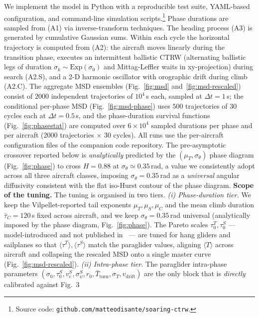 \documentclass[11pt,a4paper]{article}
\begin{document}
We implement the model in Python with a reproducible test suite,
YAML-based configuration, and command-line simulation
scripts.\footnote{Source code: \texttt{github.com/matteodisante/soaring-ctrw}.}
Phase durations are sampled from (A1) via inverse-transform
techniques. The heading process (A3) is generated by cumulative
Gaussian sums. Within each cycle the horizontal trajectory is
computed from (A2): the aircraft moves linearly during the
transition phase, executes an intermittent ballistic CTRW
(alternating ballistic legs of duration $\sigma_k\sim\mathrm{Exp}(\sigma_0)$
and Mittag-Leffler waits in xy-projection) during
search (A2.S), and a 2-D harmonic oscillator with orographic
drift during climb (A2.C).
The aggregate MSD ensembles (Fig.~\ref{fig:msd}
and~\ref{fig:msd-rescaled}) consist of $2000$ independent
trajectories of $10^4$\,s each, sampled at $\Delta t = 1$\,s; the
conditional per-phase MSD (Fig.~\ref{fig:msd-phase}) uses $500$
trajectories of $30$ cycles each at $\Delta t = 0.5$\,s, and the
phase-duration survival functions (Fig.~\ref{fig:phasestat}) are
computed over $6\times 10^4$ sampled durations per phase and per
aircraft (2000 trajectories $\times$ 30 cycles). All runs use the
per-aircraft configuration files of the companion code
repository. The
pre-asymptotic crossover reported below is \emph{analytically}
predicted by the $(\mu_T,\sigma_\theta)$ phase diagram
(Fig.~\ref{fig:phase}) to cross $H=0.88$ at $\sigma_\theta\simeq
0.35$\,rad, a value we consistently adopt across all three aircraft classes,
imposing $\sigma_\theta=0.35$\,rad as a \emph{universal} angular
diffusivity consistent with the flat iso-Hurst contour of the
phase diagram. \textbf{Scope of the tuning.} The tuning is organised
in two tiers. \emph{(i) Phase-duration tier.} We keep the
Vilpellet-reported tail exponents
$\mu_T, \mu_S, \mu_C$ and the mean climb duration
$\bar{\tau}_C = 120$\,s fixed across aircraft, and we keep
$\sigma_\theta = 0.35$\,rad universal (analytically imposed by
the phase diagram, Fig.~\ref{fig:phase}). The Pareto scales
$\tau_0^T, \tau_0^S$ --- model-introduced and not published
in~\cite{vilpellet2026} --- are tuned for hang gliders and
sailplanes so that
$\langle\tau^T\rangle, \langle\tau^S\rangle$ match the paraglider
values, aligning $\langle T\rangle$ across aircraft and
collapsing the rescaled MSD onto a single master curve
(Fig.~\ref{fig:msd-rescaled}). \emph{(ii) Intra-phase tier.} The
paraglider intra-phase parameters
$(\sigma_0, \tau_0^S, v_c^S, \sigma_\psi^S, r_0,
\bar{T}_{\mathrm{turn}}, \sigma_T, v_{\mathrm{drift}})$ are the
only block that is \emph{directly} calibrated against Fig.~3
\end{document}

